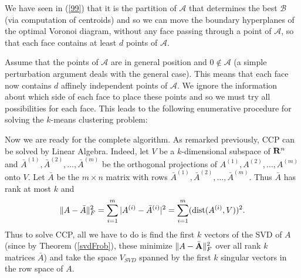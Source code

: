 \documentclass{book}
\numberwithin{exercise}{chapter}
\begin{document}
We have seen in (\ref{99}) that it is the partition of ${\mathcal A}$ that determines the best ${\mathcal B}$ (via
computation of centroids) and so we can move the boundary hyperplanes of the optimal Voronoi diagram, without any face passing through a
point of ${\mathcal A}$,
so that each face contains at least $d$ points of ${\mathcal A}$.

Assume that the points of ${\mathcal A}$ are in general position and $0\notin {\mathcal A}$ (a simple perturbation
argument deals with the general case). This means that each face now contains $d$ affinely independent
points of ${\mathcal A}$. We ignore the information about which side of each face to place these points and
so we must try all possibilities for each face. This leads to the following enumerative procedure for
solving the $k$-means clustering problem:\\


\begin{center}
\end{center}
Now we are ready for the complete algorithm.
As remarked previously, CCP can be solved by Linear Algebra. Indeed, let $V$ be a $k$-dimensional subspace
of ${\bf R}^n$ and $\bar{A}^{(1)},\bar{A}^{(2)},\ldots,\bar{A}^{(m)}$ be the orthogonal projections of
${A}^{(1)},{A}^{(2)},\ldots,{A}^{(m)}$ onto $V$. Let $\bar{A}$ be the $m\times n$ matrix with
rows $\bar{A}^{(1)},\bar{A}^{(2)},\ldots,\bar{A}^{(m)}$. Thus $\bar{A}$ has rank at most $k$
and
$$\|A-\bar{A}\|_F^2=\sum_{i=1}^m |A^{(i)}-\bar{A}^{(i)}|^2=
\sum_{i=1}^m (\hbox{dist} (A^{(i)},V))^2.$$
Thus to solve CCP, all we have to do is find the first $k$ vectors of the
SVD of $A$ (since by Theorem (\ref{svdFrob}), these
minimize $\|A-\bar{{\bf A}}\|_F^2$ over all rank $k$ matrices $\bar {A}$)
and take the space $V_{SVD}$ spanned
by the first $k$ singular vectors in the row space of $A$.
\end{document}
